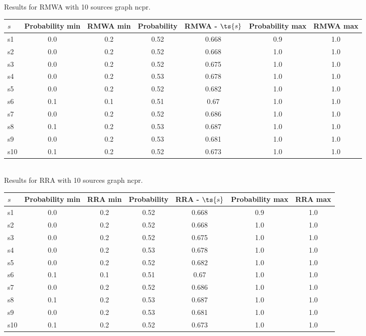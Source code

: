 \documentclass{article}
\begin{document}
\noindent Results for RMWA with 10 sources graph ncpr.

\noindent\begin{tabular}{|l|c|c|c|c|c|c|}
\hline
$s$& Probability min & RMWA min & Probability & RMWA - $\ts{s}$ & Probability max & RMWA max\\
\hline
s1 &0.0 & 0.2 & 0.52 & 0.668 & 0.9 & 1.0\\
\hline
s2 &0.0 & 0.2 & 0.52 & 0.668 & 1.0 & 1.0\\
\hline
s3 &0.0 & 0.2 & 0.52 & 0.675 & 1.0 & 1.0\\
\hline
s4 &0.0 & 0.2 & 0.53 & 0.678 & 1.0 & 1.0\\
\hline
s5 &0.0 & 0.2 & 0.52 & 0.682 & 1.0 & 1.0\\
\hline
s6 &0.1 & 0.1 & 0.51 & 0.67 & 1.0 & 1.0\\
\hline
s7 &0.0 & 0.2 & 0.52 & 0.686 & 1.0 & 1.0\\
\hline
s8 &0.1 & 0.2 & 0.53 & 0.687 & 1.0 & 1.0\\
\hline
s9 &0.0 & 0.2 & 0.53 & 0.681 & 1.0 & 1.0\\
\hline
s10 &0.1 & 0.2 & 0.52 & 0.673 & 1.0 & 1.0\\
\hline
\end{tabular}\\

\noindent Results for RRA with 10 sources graph ncpr.

\noindent\begin{tabular}{|l|c|c|c|c|c|c|}
\hline
$s$& Probability min & RRA min & Probability & RRA - $\ts{s}$ & Probability max & RRA max\\
\hline
s1 &0.0 & 0.2 & 0.52 & 0.668 & 0.9 & 1.0\\
\hline
s2 &0.0 & 0.2 & 0.52 & 0.668 & 1.0 & 1.0\\
\hline
s3 &0.0 & 0.2 & 0.52 & 0.675 & 1.0 & 1.0\\
\hline
s4 &0.0 & 0.2 & 0.53 & 0.678 & 1.0 & 1.0\\
\hline
s5 &0.0 & 0.2 & 0.52 & 0.682 & 1.0 & 1.0\\
\hline
s6 &0.1 & 0.1 & 0.51 & 0.67 & 1.0 & 1.0\\
\hline
s7 &0.0 & 0.2 & 0.52 & 0.686 & 1.0 & 1.0\\
\hline
s8 &0.1 & 0.2 & 0.53 & 0.687 & 1.0 & 1.0\\
\hline
s9 &0.0 & 0.2 & 0.53 & 0.681 & 1.0 & 1.0\\
\hline
s10 &0.1 & 0.2 & 0.52 & 0.673 & 1.0 & 1.0\\
\hline
\end{tabular}\\
\end{document}
